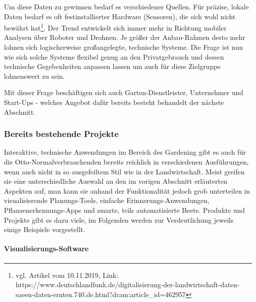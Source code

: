 Um diese Daten zu gewinnen bedarf es verschiedener Quellen. Für präzise,
lokale Daten bedarf es oft festinstallierter Hardware (Sensoren), die
sich wohl nicht bewährt hat\footnote{vgl. Artikel vom 10.11.2019, Link:
  https://www.deutschlandfunk.de/digitalisierung-der-landwirtschaft-daten-saeen-daten-ernten.740.de.html?dram:article\_id=462957}.
Der Trend entwickelt sich immer mehr in Richtung mobiler Analysen über
Roboter und Drohnen. Je größer der Anbau-Rahmen desto mehr lohnen sich
logischerweise großangelegte, technische Systeme. Die Frage ist nun wie
sich solche Systeme flexibel genug an den Privatgebrauch und dessen
technische Gegebenheiten anpassen lassen um auch für diese Zielgruppe
lohnenswert zu sein.

Mit dieser Frage beschäftigen sich auch Garten-Dienstleister,
Unternehmer und Start-Ups - welches Angebot dafür bereits besteht
behandelt der nächste Abschnitt.

\hypertarget{bereits-bestehende-projekte}{%
\subsubsection{Bereits bestehende
Projekte}\label{bereits-bestehende-projekte}}

Interaktive, technische Anwendungen im Bereich des Gardening gibt es
auch für die Otto-Normalverbrauchenden bereits reichlich in
verschiedenen Ausführungen, wenn auch nicht in so ausgefeiltem Stil wie
in der Landwirtschaft. Meist greifen sie eine unterschiedliche Auswahl
an den im vorigen Abschnitt erläuterten Aspekten auf, man kann sie
anhand der Funktionalität jedoch grob unterteilen in visualisierende
Planungs-Tools, einfache Erinnerungs-Anwendungen,
Pflanzenerkennungs-Apps und smarte, teils automatisierte Beete. Produkte
und Projekte gibt es dazu viele, im Folgenden werden zur Verdeutlichung
jeweils einige Beispiele vorgestellt.

\hypertarget{visualisierungs-software}{%
\paragraph{Visualisierungs-Software}\label{visualisierungs-software}}

